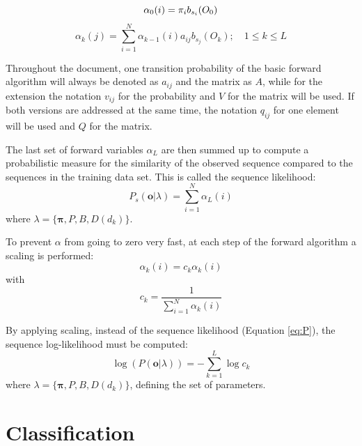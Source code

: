 \documentclass[mscthesis]{usiinfthesis}
\begin{document}
\begin{equation}
    \label{eq:forward_init_basic}
    \alpha_0(i) = \pi_{i}b_{s_i}(O_0) \\
\end{equation}
\begin{equation}
    \label{eq:forward_basic}
    \alpha_k(j) = \sum_{i=1}^{N} \alpha_{k-1}(i) a_{ij} b_{s_j}(O_k);
    \quad 1 \leq k \leq L
\end{equation}

Throughout the document, one transition probability of the basic forward
algorithm will always be denoted as $a_{ij}$ and the matrix as $A$, while for
the extension the notation $v_{ij}$ for the probability and $V$ for the matrix
will be used. If both versions are addressed at the same time, the notation
$q_{ij}$ for one element will be used and $Q$ for the matrix.

The last set of forward variables $ \alpha_L $ are then summed up to compute
a probabilistic measure for the similarity of the observed sequence compared to
the sequences in the training data set. This is called the sequence likelihood:
\begin{equation}
    \label{eq:P}
    P_s(\boldsymbol{o}|\lambda) = \sum\limits_{i=1}^{N} \alpha_L(i)
\end{equation}
where $ \lambda = \{\boldsymbol{\pi}, P, B, D(d_k) \} $.

To prevent $ \alpha $ from going to zero very fast, at each step of the forward
algorithm a scaling is performed:
\begin{equation}
    \label{eq:scaled}
    \alpha_k(i) = c_k \alpha_k(i)
\end{equation}
with
\begin{equation}
    \label{eq:scaling_factor}
    c_k = \frac{1}{\sum\limits_{i=1}^{N} \alpha_k(i)}
\end{equation}

By applying scaling, instead of the sequence likelihood (Equation \ref{eq:P}),
the sequence log-likelihood must be computed:
\begin{equation}
    \label{eq:Plog}
    \log(P(\boldsymbol{o}|\lambda)) = -\sum\limits_{k=1}^{L} \log c_k
\end{equation}
where $ \lambda = \{\boldsymbol{\pi}, P, B, D(d_k) \} $, defining the set of
parameters.

\section{Classification}
\label{ch:event_class}
\end{document}
